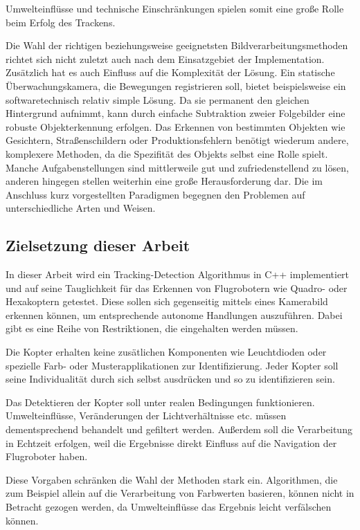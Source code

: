 Umwelteinflüsse und technische Einschränkungen spielen somit eine große Rolle beim Erfolg des Trackens\cite{OTS}. 

Die Wahl der richtigen beziehungsweise geeignetsten Bildverarbeitungsmethoden richtet sich nicht zuletzt auch nach dem Einsatzgebiet der Implementation. Zusätzlich hat es auch Einfluss auf die Komplexität der Lösung. Ein statische Überwachungskamera, die Bewegungen registrieren soll, bietet beispielsweise ein softwaretechnisch relativ simple Lösung. Da sie permanent den gleichen Hintergrund aufnimmt, kann durch einfache Subtraktion zweier Folgebilder eine robuste Objekterkennung erfolgen. Das Erkennen von bestimmten Objekten wie Gesichtern, Straßenschildern oder Produktionsfehlern benötigt wiederum andere, komplexere Methoden, da die Spezifität des Objekts selbst eine Rolle spielt. Manche Aufgabenstellungen sind mittlerweile gut und zufriedenstellend zu lösen, anderen hingegen stellen weiterhin eine große Herausforderung dar. Die im Anschluss kurz vorgestellten Paradigmen begegnen den Problemen auf unterschiedliche Arten und Weisen.

\subsection{Zielsetzung dieser Arbeit}
In dieser Arbeit wird ein Tracking-Detection Algorithmus in C++ implementiert und auf seine Tauglichkeit für das Erkennen von Flugrobotern wie Quadro- oder Hexakoptern getestet. Diese sollen sich gegenseitig mittels eines Kamerabild erkennen können, um entsprechende autonome Handlungen auszuführen. Dabei gibt es eine Reihe von Restriktionen, die eingehalten werden müssen.

Die Kopter erhalten keine zusätlichen Komponenten wie Leuchtdioden oder spezielle Farb- oder Musterapplikationen zur Identifizierung. Jeder Kopter soll seine Individualität durch sich selbst ausdrücken und so zu identifizieren sein.

Das Detektieren der Kopter soll unter realen Bedingungen funktionieren. Umwelteinflüsse, Veränderungen der Lichtverhältnisse etc. müssen dementsprechend behandelt und gefiltert werden. Außerdem soll die Verarbeitung in Echtzeit erfolgen, weil die Ergebnisse direkt Einfluss auf die Navigation der Flugroboter haben.

Diese Vorgaben schränken die Wahl der Methoden stark ein. Algorithmen, die zum Beispiel allein auf die Verarbeitung von Farbwerten basieren, können nicht in Betracht gezogen werden, da Umwelteinflüsse das Ergebnis leicht verfälschen können.

